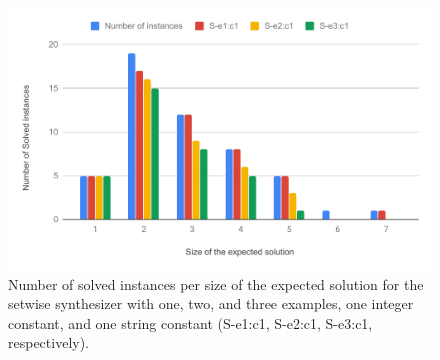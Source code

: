 \begin{table}[]
  \noindent{}
  \caption{Comparison between the different configurations by number of instances
    solved and running wall-clock time for solved instances (not necessarily
    matching the expected solution).}
  \label{table:comparison-configs}
\end{table}

\begin{figure}
  \centering
  \includegraphics[width=1.0\textwidth]{assets/bar-chart-solved-setwise.pdf}
  \caption{Number of solved instances per size of the expected solution for
    the setwise synthesizer with one, two, and three examples, one integer
    constant, and one string constant (S-e1:c1, S-e2:c1, S-e3:c1, respectively).}
  \label{fig:bar-chart-solved-setwise}
\end{figure}

